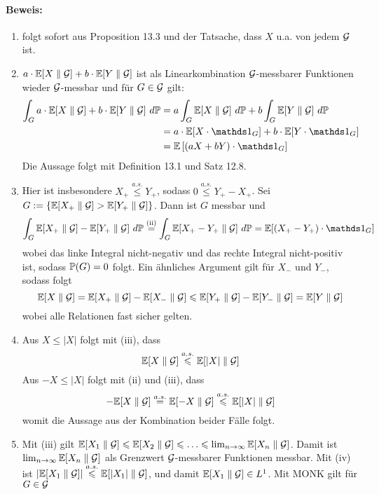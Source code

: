      \paragraph{Beweis:}
     \begin{enumerate}[label=(\roman*)]
         \item folgt sofort aus Proposition 13.3 und der Tatsache, dass $X$ u.a. von jedem $\mathcal{G}$ ist.
         \item $a\cdot\mathbb{E}[X\parallel\mathcal{G}]+b\cdot\mathbb{E}[Y\parallel\mathcal{G}]$ ist als Linearkombination $\mathcal{G}$-messbarer Funktionen wieder $\mathcal{G}$-messbar und f\"ur $G\in\mathcal{G}$ gilt:
         \begin{align*}
             \int_Ga\cdot\E[X\parallel\G]+b\cdot\E[Y\parallel\G]\ d\Pp&=a\int_G\E[X\parallel\G]\ d\Pp+b\int_G\E[Y\parallel\G]\ d\Pp\\
             &=a\cdot\E[X\cdot\ind{G}]+b\cdot\E[Y\cdot\ind{G}]\\
             &=\E\left[(aX+bY)\cdot\ind{G}\right]
         \end{align*}
         Die Aussage folgt mit Definition 13.1 und Satz 12.8.
         \item Hier ist insbesondere $X_+\overset{a.s.}{\leq}Y_+$, sodass $0\overset{a.s.}{\leq} Y_+-X_+$. Sei $G:=\left\{\mathbb{E}[X_+\parallel\mathcal{G}]>\mathbb{E}[Y_+\parallel\mathcal{G}]\right\}$. Dann ist $G$ messbar und 
         $$\int_G\E[X_+\parallel\G]-\E[Y_+\parallel\G]\ d\Pp\overset{\text{(ii)}}{=}\int_G\E[X_+-Y_+\parallel\G]\ d\Pp=\E[(X_+-Y_+)\cdot\ind{G}]$$
         wobei das linke Integral nicht-negativ und das rechte Integral nicht-positiv ist, sodass $\mathbb{P}(G)=0$ folgt. Ein \"ahnliches Argument gilt f\"ur $X_-$ und $Y_-$, sodass folgt
         $$\mathbb{E}[X\parallel\mathcal{G}]=\mathbb{E}[X_+\parallel\mathcal{G}]-\mathbb{E}[X_-\parallel\mathcal{G}]\leqslant\mathbb{E}[Y_+\parallel\mathcal{G}]-\mathbb{E}[Y_-\parallel\mathcal{G}]=\mathbb{E}[Y\parallel\mathcal{G}]$$
         wobei alle Relationen fast sicher gelten. 
         \item Aus $X\leq|X|$ folgt mit (iii), dass 
         $$\mathbb{E}[X\parallel\mathcal{G}]\overset{a.s.}{\leqslant}\mathbb{E}[|X|\parallel\mathcal{G}]$$ 
         Aus $-X\leq|X|$ folgt mit (ii) und (iii), dass 
         $$-\mathbb{E}[X\parallel\mathcal{G}]\overset{a.s.}{=}\mathbb{E}[-X\parallel\mathcal{G}]\overset{a.s.}{\leqslant}\mathbb{E}[|X|\parallel\mathcal{G}]$$
         womit die Aussage aus der Kombination beider F\"alle folgt.
         \item Mit (iii) gilt $\mathbb{E}[X_1\parallel\mathcal{G}]\leqslant\mathbb{E}[X_2\parallel\mathcal{G}]\leqslant\hdots\leqslant\lim_{n\to\infty}\mathbb{E}[X_n\parallel\mathcal{G}]$. Damit ist $\lim_{n\to\infty}\mathbb{E}[X_n\parallel\mathcal{G}]$ als Grenzwert $\mathcal{G}$-messbarer Funktionen messbar. Mit (iv) ist $|\mathbb{E}[X_1\parallel\mathcal{G}]|\overset{a.s.}{\leqslant}\mathbb{E}[|X_1|\parallel\mathcal{G}]$, und damit $\mathbb{E}[X_1\parallel\mathcal{G}]\in L^1$. Mit MONK gilt f\"ur $G\in\mathcal{G}$

\end{enumerate}
